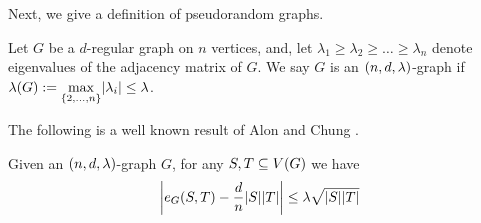 \documentclass[11pt]{article}
\begin{document}
Next, we give a definition of pseudorandom graphs.

\begin{definition}\label{def:expander-graphs}
Let $G$ be a $d$-regular graph on $n$ vertices, and, let $\lambda_1 \geq \lambda_2 \ge \dots \geq \lambda_n$ denote eigenvalues of the adjacency matrix of $G$.
We say $G$ is an $\EnDeeLambda$-graph if $\ExpansionFactor{\Graph} := \underset{{\{2, \dots, n\}}}{\max}|\lambda_i| \leq \lambda$.
\end{definition}

The following is a well known result of Alon and Chung \cite{alon88mixing}.

\begin{lemma}\label{lemma:expanders-mixing-lemma}
  Given an $\EnDeeLambda$-graph $G$, for any $S, T \subseteq \Vertices{G}$ we have
$$
  \left| \CutEdges{S}{T}{G} - \frac{d}{n}|S||T| \right|
  \le \lambda\sqrt{\Size{S}\Size{T} }
$$
\end{lemma}


\end{document}
